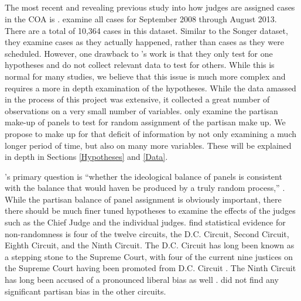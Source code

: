 \documentclass[12pt]{article}
\begin{document}
\subsection*{\cite{Chilton2014}}
The most recent and revealing previous study into how judges are assigned cases in the COA is \cite{Chilton2014}.  \citeauthor{Chilton2014} examine all cases for September 2008 through August 2013.  There are a total of 10,364 cases in this dataset.  Similar to the Songer dataset, they examine cases as they actually happened, rather than cases as they were scheduled.  However, one drawback to \citeauthor{Chilton2014}'s work is that they only test for one hypotheses and do not collect relevant data to test for others.  While this is normal for many studies, we believe that this issue is much more complex and requires a more in depth examination of the hypotheses.  While the data amassed in the process of this project was extensive, it collected a great number of observations on a very small number of variables.  \citeauthor{Chilton2014} only examine the partisan make-up of panels to test for random assignment of the partisan make up.  We propose to make up for that deficit of information by not only examining a much longer period of time, but also on many more variables. These will be explained in depth in Sections \ref{Hypotheses} and \ref{Data}.  

\citeauthor{Chilton2014}'s primary question is ``whether the ideological balance of panels is consistent with the balance that would haven be produced by a truly random process,'' \citep[20]{Chilton2014}.  While the partisan balance of panel assignment is obviously important, there there should be much finer tuned hypotheses to examine the effects of the judges such as the Chief Judge and the individual judges.  \citeauthor{Chilton2014} find statistical evidence for non-randomness is four of the twelve circuits, the D.C. Circuit, Second Circuit, Eighth Circuit, and the Ninth Circuit.  The D.C. Circuit has long been known as a stepping stone to the Supreme Court, with four of the current nine justices on the Supreme Court having been promoted from D.C. Circuit \citep{FJC}.  The Ninth Circuit has long been accused of a pronounced liberal bias as well \citep{farris1997ninth,scott2006supreme,herald1998reversed,chemerinsky2003myth,chemerinsky2003myth,goldman1968conflict}.  \citeauthor{Chilton2014} did not find any significant partisan bias in the other circuits.
\end{document}
